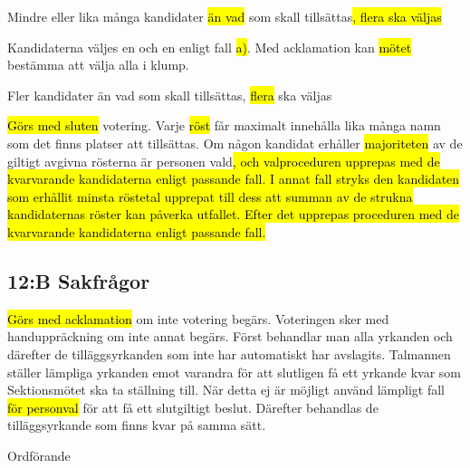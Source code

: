 \documentclass[../_main/handlingar.tex]{subfiles}
\begin{document}
\begin{attsatser}
\begin{alphlist}
        \item Mindre eller lika många kandidater \hl{än vad} som skall tillsättas\hl{, flera ska väljas}\par
        Kandidaterna väljes en och en enligt fall \hl{a)}. Med acklamation kan \hl{mötet} bestämma att välja alla i klump.

        \item Fler kandidater än vad som skall tillsättas, \hl{flera} ska väljas \par
        \hl{Görs med sluten} votering. Varje \hl{röst} får maximalt innehålla lika många namn som det finns platser att tillsättas. Om någon kandidat erhåller \hl{majoriteten} av de giltigt avgivna rösterna är personen vald\hl{, och valproceduren upprepas med de kvarvarande kandidaterna enligt passande fall. I annat fall stryks den kandidaten som erhållit minsta röstetal upprepat till dess att summan av de strukna kandidaternas röster kan påverka utfallet. Efter det upprepas proceduren med de kvarvarande kandidaterna enligt passande fall.}
        \end{alphlist}

        \subsection{12:B Sakfrågor}

        \hl{Görs med acklamation} om inte votering begärs. Voteringen sker med handuppräckning om inte annat begärs. Först behandlar man alla yrkanden och därefter de tilläggsyrkanden som inte har automatiskt har avslagits. Talmannen ställer lämpliga yrkanden emot varandra för att slutligen få ett yrkande kvar som Sektionsmötet ska ta ställning till. När detta ej är möjligt använd lämpligt fall \hl{för personval} för att få ett slutgiltigt beslut. Därefter behandlas de tilläggsyrkande som finns kvar på samma sätt.

    \changenote

\end{attsatser}

\begin{signatures}{1}
    \ist
    \signature{\ordf}{Ordförande}
\end{signatures}
\end{document}
